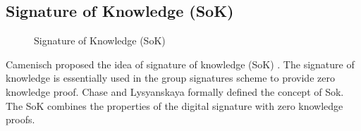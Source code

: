 \subsection{Signature of Knowledge (SoK)}\label{subsection:Signature of Knowledge}
\begin{figure}[h]
\begin{tcolorbox}[adjusted title = Signature of Knowledge (SoK), title filled, halign title=flush center, colback=black!2!white,]
\vspace{0.25cm}
\begin{center}
\linespread{1}
\end{center}
\end{tcolorbox}
\caption{Signature of Knowledge (SoK)}
\label{fig:Signature of Knowledge(SoK}
\end{figure}
\clearpage
Camenisch proposed the idea of signature of knowledge (SoK) \cite{camenisch1997efficientand}. The signature of knowledge is essentially used in the group signatures scheme to provide zero knowledge proof. Chase and Lysyanskaya \cite{chase2006signatures} formally defined the concept of Sok. The SoK combines the properties of the digital signature with zero knowledge proofs.


